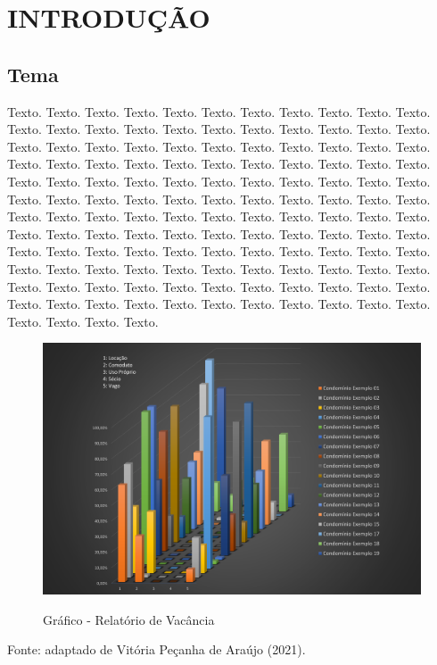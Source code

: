 \section{INTRODUÇÃO}\label{sec:intro}
    \subsection{Tema}

\begin{onehalfspacing}
    \begin{justify}
        \begin{large}
            Texto. Texto. Texto. Texto. Texto. Texto. Texto. Texto. Texto. Texto. Texto. Texto. Texto. Texto. Texto. Texto. Texto. Texto. Texto. Texto. Texto. Texto. Texto. Texto. Texto. Texto. Texto. Texto. Texto. Texto. Texto. Texto. Texto. Texto. Texto. Texto. Texto. Texto. Texto. Texto. Texto. Texto. Texto. Texto. Texto. Texto. Texto. Texto. Texto. Texto. Texto. Texto. Texto. Texto. Texto. Texto. Texto. Texto. Texto. Texto. Texto. Texto. Texto. Texto. Texto. Texto. Texto. Texto. Texto. Texto. Texto. Texto. Texto. Texto. Texto. Texto. Texto. Texto. Texto. Texto. Texto. Texto. Texto. Texto. Texto. Texto. Texto. Texto. Texto. Texto. Texto. Texto. Texto. Texto. Texto. Texto. Texto. Texto. Texto. Texto. Texto. Texto. Texto. Texto. Texto. Texto. Texto. Texto. Texto. Texto. Texto. Texto. Texto. Texto. Texto. Texto. Texto. Texto. Texto. Texto. Texto. Texto. Texto. Texto. Texto. Texto. Texto. Texto. Texto. Texto. Texto. Texto. Texto. Texto. Texto. Texto.
        \end{large}
    \end{justify}
\end{onehalfspacing}

\begin{figure}[ht]\caption{Gráfico - Relatório de Vacância}
    \centering
        \includegraphics[scale = 0.5]{images/relatorio-vacancia.png}
        \label{figure:tiposdeinovacao}
\end{figure}
\begin{flushleft}
    \begin{small}
        Fonte: adaptado de Vitória Peçanha de Araújo (2021).\\
    \end{small}
\end{flushleft}

